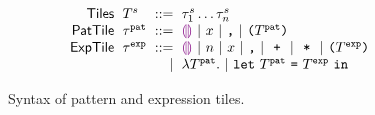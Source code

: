 \begin{figure}
  \vspace{-3px}
  \[
  \arraycolsep=3pt\begin{array}{rlrl}
      \mathsf{Tiles} & \tiles^s & ::= & \tile^s_1\dots\tile^s_n \\
      \mathsf{PatTile} & \tile^{\pat} & ::= &
        \shole ~\vert~
        \svar{x} ~\vert~
        \sprod{}{} ~\vert~
        \sparen{\tiles^{\pat}}\\
      \mathsf{ExpTile} & \tile^{\expr} & ::= &
        \shole ~\vert~
        \snumlit{n} ~\vert~
        \svar{x} ~\vert~
        \sprod{}{} ~\vert~
        \splus{}{} ~\vert~
        \smult{}{} ~\vert~
        \sparen{\tiles^{\expr}} \\
      & & \vert &
        \slam{\tiles^{\pat}}{} ~\vert~
        \slet{\tiles^{\pat}}{\tiles^{\expr}}{} %
  \end{array}\]
  \caption{
    Syntax of pattern and expression tiles.
  }
  \label{fig:tile-syntax}
\end{figure}
